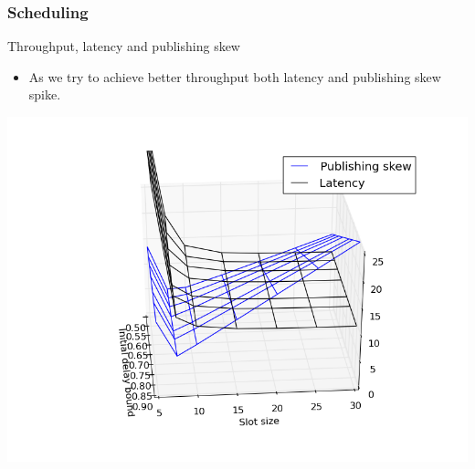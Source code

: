 \documentclass[]{prezentare}
\begin{document}
\begin{frame}
	\frametitle{Scheduling}
	\begin{block}{Throughput, latency and publishing skew}
	\begin{itemize}
	\item As we try to achieve better throughput both latency and publishing skew spike.
	\end{itemize}
	\vspace{-5mm}
	\begin{center}
		\includegraphics[scale=.375]{../Images/skew_lat_sim}
	\end{center}
	\end{block}
\end{frame}
\end{document}
